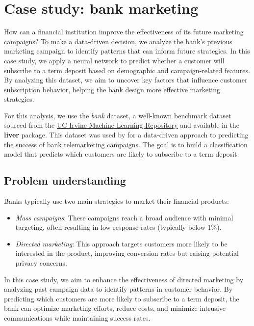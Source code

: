 \documentclass[
  11pt,
]{book}
\providecommand{\tightlist}{%
  \setlength{\itemsep}{0pt}\setlength{\parskip}{0pt}}
\theoremstyle{definition}
\theoremstyle{definition}
\theoremstyle{definition}
\theoremstyle{definition}
\theoremstyle{remark}
\begin{document}
\section{Case study: bank marketing}\label{case-study-bank-marketing}

How can a financial institution improve the effectiveness of its future marketing campaigns? To make a data-driven decision, we analyze the bank's previous marketing campaign to identify patterns that can inform future strategies. In this case study, we apply a neural network to predict whether a customer will subscribe to a term deposit based on demographic and campaign-related features. By analyzing this dataset, we aim to uncover key factors that influence customer subscription behavior, helping the bank design more effective marketing strategies.

For this analysis, we use the \emph{bank} dataset, a well-known benchmark dataset sourced from the \href{https://archive.ics.uci.edu/dataset/222/bank+marketing}{UC Irvine Machine Learning Repository} and available in the \textbf{liver} package. This dataset was used by \citet{moro2014data} for a data-driven approach to predicting the success of bank telemarketing campaigns. The goal is to build a classification model that predicts which customers are likely to subscribe to a term deposit.

\subsection*{Problem understanding}\label{problem-understanding-3}


Banks typically use two main strategies to market their financial products:

\begin{itemize}
\tightlist
\item
  \emph{Mass campaigns}: These campaigns reach a broad audience with minimal targeting, often resulting in low response rates (typically below 1\%).\\
\item
  \emph{Directed marketing}: This approach targets customers more likely to be interested in the product, improving conversion rates but raising potential privacy concerns.
\end{itemize}

In this case study, we aim to enhance the effectiveness of directed marketing by analyzing past campaign data to identify patterns in customer behavior. By predicting which customers are more likely to subscribe to a term deposit, the bank can optimize marketing efforts, reduce costs, and minimize intrusive communications while maintaining success rates.
\end{document}
